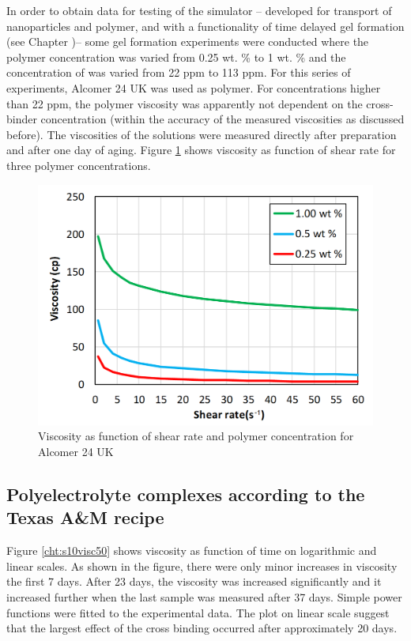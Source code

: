 In order to obtain data for testing of the simulator \--- developed for transport of nanoparticles and polymer, and with a functionality of time delayed gel formation (see Chapter \what)\--- some gel formation experiments were conducted where the polymer concentration was varied from 0.25 wt. \% to 1 wt. \% and the concentration of  was varied from 22 ppm to 113 ppm. For this series of experiments, Alcomer 24 UK was used as polymer. For concentrations higher than 22 ppm, the polymer viscosity was apparently not dependent on the cross-binder concentration (within the accuracy of the measured viscosities as discussed before). The viscosities of the solutions were measured directly after preparation and after one day of aging. Figure \ref{cht:viscAlco} shows viscosity as function of shear rate for three polymer concentrations. 
\begin{figure}
    \centering
    \includegraphics[width=.75\textwidth]{img/cht/viscAlcomer.png}
    \caption{Viscosity as function of shear rate and polymer concentration for Alcomer 24 UK}
    \label{cht:viscAlco}
\end{figure}

\subsection{Polyelectrolyte complexes according to the Texas A\&M recipe}

Figure \ref{cht:s10visc50} shows viscosity as function of time on logarithmic and linear scales. As shown in the figure, there were only minor increases in viscosity the first 7 days. After 23 days, the viscosity was increased significantly and it increased further when the last sample was measured after 37 days. Simple power functions were fitted to the experimental data. The plot on linear scale suggest that the largest effect of the cross binding occurred after approximately 20 days. 

